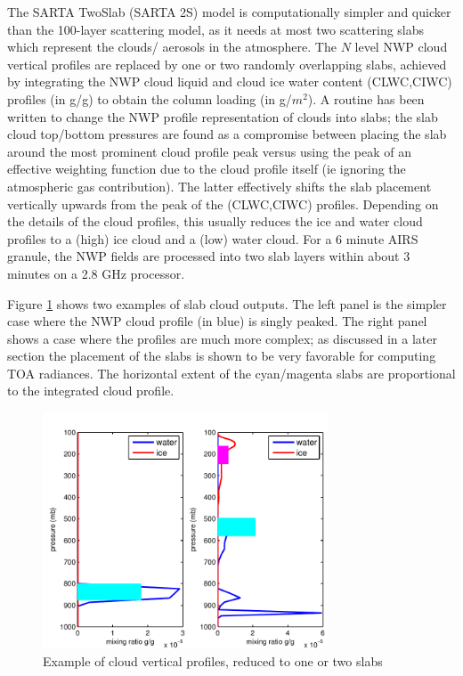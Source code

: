 \documentclass[agupp]{aguplus}              %
\begin{document}
\begin{article}
The SARTA TwoSlab (SARTA 2S) model is computationally simpler and
quicker than the 100-layer scattering model, as it needs at most two
scattering slabs which represent the clouds/ aerosols in the
atmosphere. The $N$ level NWP cloud vertical profiles are replaced by
one or two randomly overlapping slabs, achieved by integrating the NWP
cloud liquid and cloud ice water content (CLWC,CIWC) profiles (in g/g)
to obtain the column loading (in g/$m^2$). A routine has been written
to change the NWP profile representation of clouds into slabs; the
slab cloud top/bottom pressures are found as a compromise between
placing the slab around the most prominent cloud profile peak versus
using the peak of an effective weighting function due to the cloud
profile itself (ie ignoring the atmospheric gas contribution). The
latter effectively shifts the slab placement vertically upwards from
the peak of the (CLWC,CIWC) profiles. Depending on the details of the
cloud profiles, this usually reduces the ice and water cloud profiles
to a (high) ice cloud and a (low) water cloud. For a 6 minute AIRS
granule, the NWP fields are processed into two slab layers within
about 3 minutes on a 2.8 GHz processor.

Figure \ref{slab12} shows two examples of slab cloud
outputs.  The left panel is the simpler case where the NWP cloud
profile (in blue) is singly peaked. The right panel shows a case where
the profiles are much more complex; as discussed in a later section the
placement of the slabs is shown to be very favorable for computing TOA
radiances. The horizontal extent of the cyan/magenta slabs
are proportional to the integrated cloud profile.

\begin{figure}[h]
\noindent\includegraphics[width=20pc]{FIGS/clouds_profileG040_271_321.pdf}
\caption{Example of cloud vertical profiles, reduced to one or two slabs}
\label{slab12}
\end{figure}


\end{article}
\end{document}
